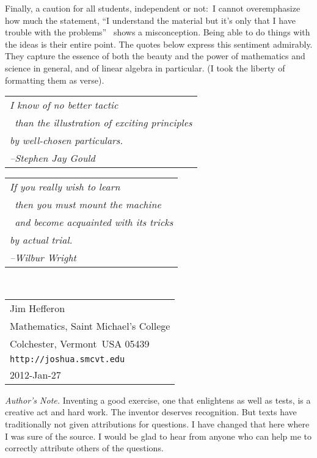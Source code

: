 \bigskip
Finally, a caution for all students, independent or not:~I 
cannot overemphasize how much the 
statement, ``I understand the material but it's only 
that I have trouble with the problems''\ %
shows a misconception.
Being able to do things with the ideas is their entire point.
The quotes below express this sentiment admirably.
They capture the essence of both the beauty and the power
of mathematics and science in general, 
and of linear algebra in particular.
(I took the liberty of formatting them as verse).

\bigskip
\par\noindent\begin{tabular}[t]{@{}l@{}}
  \textit{I know of no better tactic}                     \\
  \textit{\ than the illustration of exciting principles} \\
  \textit{by well-chosen particulars.}                    \\
  \hspace*{1in}\textit{--Stephen Jay Gould}
\end{tabular}

\bigskip
\par\noindent
\begin{tabular}[t]{@{}l@{}}   
\textit{If you really wish to learn}                     \\
   \textit{\ then you must mount the machine}  \\ 
   \textit{\ and become acquainted with its tricks} \\
   \textit{by actual trial.}                    \\
   \hspace*{1in}\textit{--Wilbur Wright}
\end{tabular}

\par\ \hfill\begin{tabular}[t]{@{}l@{}}
                       Jim Hef{}feron            \\
                       Mathematics, Saint Michael's College \\ 
                       Colchester, Vermont\ USA 05439  \\     
                       \texttt{http://joshua.smcvt.edu} \\
                       2012-Jan-27
                    \end{tabular}

\vfill
\par\noindent\textit{Author's Note.}
Inventing a good exercise, one that enlightens as well as tests, 
is a creative act and hard work.
The inventor deserves recognition.
But texts have traditionally not given attributions for
questions.
I have changed that here where I was sure of the source.
I would be glad to hear from anyone who can help me to correctly
attribute others of the questions.   

